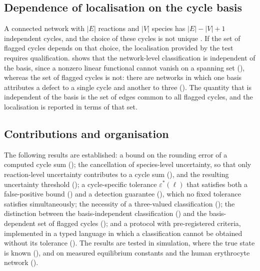 \documentclass[11pt,a4paper]{article}
\theoremstyle{pstyle}
\theoremstyle{definition}
\theoremstyle{remark}
\newcommand{\abs}[1]{\lvert#1\rvert}
\newcommand{\eps}{\varepsilon}
\newcommand{\epsstar}{\eps^{\ast}}
\begin{document}
\subsection{Dependence of localisation on the cycle basis}

A connected network with $\abs{E}$ reactions and $\abs{V}$ species has
$\abs{E}-\abs{V}+1$ independent cycles, and the choice of these cycles
is not unique \citep{kavitha2009,diestel2017}. If the set of flagged
cycles depends on that choice, the localisation provided by the test
requires qualification.  shows that the network-level
classification is independent of the basis, since a nonzero linear
functional cannot vanish on a spanning set (),
whereas the set of flagged cycles is not: there are networks in which
one basis attributes a defect to a single cycle and another to three
(). The quantity that is independent of
the basis is the set of edges common to all flagged cycles, and the
localisation is reported in terms of that set.

\subsection{Contributions and organisation}

The following results are established: a bound on the rounding error of
a computed cycle sum (); the cancellation of
species-level uncertainty, so that only reaction-level uncertainty
contributes to a cycle sum (), and the
resulting uncertainty threshold (); a
cycle-specific tolerance $\epsstar(\ell)$ that satisfies both a
false-positive bound () and a detection
guarantee (), which no fixed tolerance satisfies
simultaneously; the necessity of a three-valued classification
(); the distinction between the basis-independent
classification () and the basis-dependent set of
flagged cycles (); and a
protocol with pre-registered criteria, implemented in a typed language
in which a classification cannot be obtained without its tolerance
(). The results are tested in simulation, where the
true state is known (),
and on measured equilibrium constants and the human erythrocyte network
().

\end{document}
